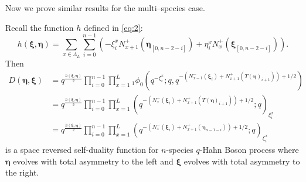 \documentclass{ximera}
\begin{document}
Now we prove similar results for the multi--species case. 
\begin{theorem} 
Recall the function $h$ defined in \eqref{eq:2}:
\begin{equation*}
h(\boldsymbol\xi,\boldsymbol\eta)=\sum_{x \in \Lambda_L}\sum_{i=0}^{n-1}\left(-\xi_i^xN_{x+1}^+(\boldsymbol\eta_{[0,n-2-i]})+\eta_i^xN_{x}^+(\boldsymbol\xi_{[0,n-2-i]})\right).
\end{equation*}
Then
\begin{equation*}
\begin{array}{cl}
    D(\boldsymbol\eta,\boldsymbol\xi)   &   =q^{\frac{h(\boldsymbol\xi,\boldsymbol\eta)}{2}} \prod_{i=0}^{n-1}\prod_{x=1}^L{}_1\phi_0\left(q^{-\xi_i^x};q,q^{-\left(N_{x-1}^-(\boldsymbol\xi_i)+N_{x+1}^+(T(\boldsymbol\eta)_{i+1})\right)+1/2}\right)\\
     &   =q^{\frac{h(\boldsymbol\xi,\boldsymbol\eta)}{2}} \prod_{i=0}^{n-1}\prod_{x=1}^L\left(q^{-\left(N_{x}^-(\boldsymbol\xi_i)+N_{x+1}^+(T(\boldsymbol\eta)_{i+1})\right)+1/2} ;q\right)_{\xi_i^x}
     \\
     & =q^{\frac{h(\boldsymbol\xi,\boldsymbol\eta)}{2}} \prod_{i=0}^{n-1}\prod_{x=1}^L\left(q^{-\left(N_{x}^-(\boldsymbol\xi_i)+N_{x+1}^+(\boldsymbol\eta_{n-1-i})\right)+1/2} ;q\right)_{\xi_i^x}
\end{array}
\end{equation*} is a space reversed self-duality function for $n$-species $q$-Hahn Boson process where $\boldsymbol\eta$ evolves with total asymmetry to the left and $\boldsymbol\xi$ evolves with total asymmetry to the right.
\end{theorem}
\end{document}
